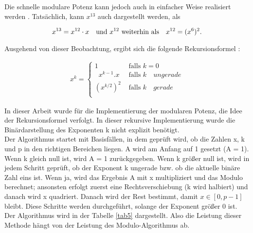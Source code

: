 Die schnelle modulare Potenz kann jedoch auch in einfacher Weise realisiert werden \cite{langME}. Tatsächlich, kann \( x^{13}\) auch dargestellt werden, als 

\begin{align*}
    x^{13} = x^{12} \cdot x \quad \text{und \( x^{12}\) weiterhin als} \quad x^{12} = (x^{6})^2.
\end{align*}

Ausgehend von dieser Beobachtung, ergibt sich die folgende Rekursionsformel \cite{langME}:

\begin{ceqn}
\begin{align*}
     x^k = \begin{cases}
     1    & \text{ falls } k = 0 \\
    \;\;x^{k-1}.x  & \text{ falls } k \quad ungerade \\
    (x^{k/2})^2     & \text{ falls } k \quad gerade \\
    \end{cases}
\end{align*}
\end{ceqn}

In dieser Arbeit wurde für die Implementierung der modularen Potenz, die Idee der Rekursionsformel verfolgt.
In dieser rekursive Implementierung wurde die Binärdarstellung des Exponenten k nicht explizit benötigt.\\

Der Algorithmus startet mit Basisfällen, in dem geprüft wird, ob die Zahlen x, k und p in den richtigen Bereichen liegen. 
A wird am Anfang auf 1 gesetzt (A = 1). Wenn k gleich null ist, wird A = 1 zurückgegeben. 
Wenn k größer null ist, wird in jedem Schritt geprüft, ob der Exponent k ungerade bzw. ob die aktuelle binäre Zahl eins ist. 
Wenn ja, wird das Ergebnis A mit x multipliziert und das Modulo berechnet; ansonsten erfolgt zuerst eine
Rechtsverschiebung (k wird halbiert) und danach wird x quadriert. Danach wird der Rest bestimmt, damit $x \in [0, p-1] $ bleibt.
Diese Schritte werden durchgeführt, solange der Exponent größer 0 ist. Der Algorithmus wird in der Tabelle \ref{tab5} dargestellt.
Also die Leistung dieser Methode hängt von der Leistung des Modulo-Algorithmus ab.


